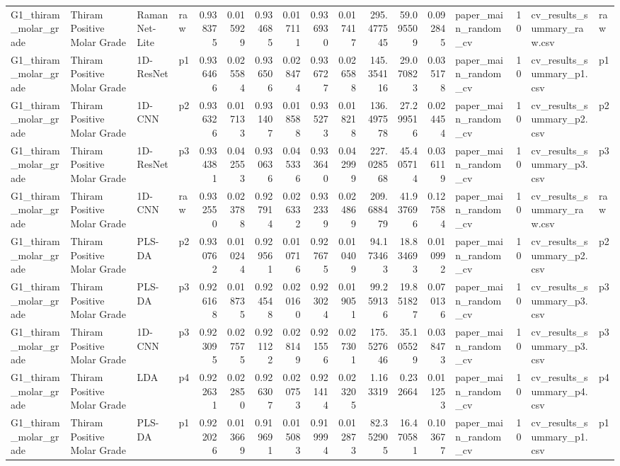 \begin{tabular}{llllrrrrrrrrrlrll}
G1_thiram_molar_grade & Thiram Positive Molar Grade & RamanNet-Lite & raw & 0.938375 & 0.015929 & 0.934685 & 0.017111 & 0.936930 & 0.017417 & 295.477545 & 59.095509 & 0.092845 & paper_main_random_cv & 10 & cv_results_summary_raw.csv & raw \\
G1_thiram_molar_grade & Thiram Positive Molar Grade & 1D-ResNet & p1 & 0.936466 & 0.025584 & 0.936506 & 0.028474 & 0.936727 & 0.026588 & 145.354116 & 29.070823 & 0.035178 & paper_main_random_cv & 10 & cv_results_summary_p1.csv & p1 \\
G1_thiram_molar_grade & Thiram Positive Molar Grade & 1D-CNN & p2 & 0.936326 & 0.017133 & 0.931407 & 0.018588 & 0.935273 & 0.018218 & 136.497578 & 27.299516 & 0.024454 & paper_main_random_cv & 10 & cv_results_summary_p2.csv & p2 \\
G1_thiram_molar_grade & Thiram Positive Molar Grade & 1D-ResNet & p3 & 0.934381 & 0.042553 & 0.930636 & 0.045336 & 0.933640 & 0.042999 & 227.028568 & 45.405714 & 0.036119 & paper_main_random_cv & 10 & cv_results_summary_p3.csv & p3 \\
G1_thiram_molar_grade & Thiram Positive Molar Grade & 1D-CNN & raw & 0.932550 & 0.023788 & 0.927914 & 0.026332 & 0.932339 & 0.024869 & 209.688479 & 41.937696 & 0.127584 & paper_main_random_cv & 10 & cv_results_summary_raw.csv & raw \\
G1_thiram_molar_grade & Thiram Positive Molar Grade & PLS-DA & p2 & 0.930762 & 0.010244 & 0.929561 & 0.010716 & 0.927675 & 0.010409 & 94.173463 & 18.834693 & 0.010992 & paper_main_random_cv & 10 & cv_results_summary_p2.csv & p2 \\
G1_thiram_molar_grade & Thiram Positive Molar Grade & PLS-DA & p3 & 0.926168 & 0.018735 & 0.924548 & 0.020160 & 0.923024 & 0.019051 & 99.259136 & 19.851827 & 0.070136 & paper_main_random_cv & 10 & cv_results_summary_p3.csv & p3 \\
G1_thiram_molar_grade & Thiram Positive Molar Grade & 1D-CNN & p3 & 0.923095 & 0.027575 & 0.921122 & 0.028149 & 0.921556 & 0.027301 & 175.527646 & 35.105529 & 0.038473 & paper_main_random_cv & 10 & cv_results_summary_p3.csv & p3 \\
G1_thiram_molar_grade & Thiram Positive Molar Grade & LDA & p4 & 0.922631 & 0.022850 & 0.926307 & 0.020753 & 0.921414 & 0.023205 & 1.163319 & 0.232664 & 0.011253 & paper_main_random_cv & 10 & cv_results_summary_p4.csv & p4 \\
G1_thiram_molar_grade & Thiram Positive Molar Grade & PLS-DA & p1 & 0.922026 & 0.013669 & 0.919691 & 0.015083 & 0.919994 & 0.012873 & 82.352905 & 16.470581 & 0.103677 & paper_main_random_cv & 10 & cv_results_summary_p1.csv & p1 \\

\end{tabular}
